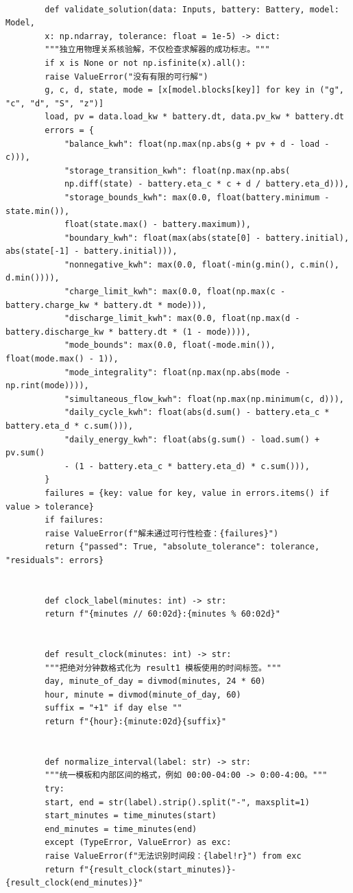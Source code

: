 \documentclass[UTF8]{ctexart}
\begin{document}
\begin{verbatim}
        
        def validate_solution(data: Inputs, battery: Battery, model: Model,
        x: np.ndarray, tolerance: float = 1e-5) -> dict:
        """独立用物理关系核验解，不仅检查求解器的成功标志。"""
        if x is None or not np.isfinite(x).all():
        raise ValueError("没有有限的可行解")
        g, c, d, state, mode = [x[model.blocks[key]] for key in ("g", "c", "d", "S", "z")]
        load, pv = data.load_kw * battery.dt, data.pv_kw * battery.dt
        errors = {
            "balance_kwh": float(np.max(np.abs(g + pv + d - load - c))),
            "storage_transition_kwh": float(np.max(np.abs(
            np.diff(state) - battery.eta_c * c + d / battery.eta_d))),
            "storage_bounds_kwh": max(0.0, float(battery.minimum - state.min()),
            float(state.max() - battery.maximum)),
            "boundary_kwh": float(max(abs(state[0] - battery.initial), abs(state[-1] - battery.initial))),
            "nonnegative_kwh": max(0.0, float(-min(g.min(), c.min(), d.min()))),
            "charge_limit_kwh": max(0.0, float(np.max(c - battery.charge_kw * battery.dt * mode))),
            "discharge_limit_kwh": max(0.0, float(np.max(d - battery.discharge_kw * battery.dt * (1 - mode)))),
            "mode_bounds": max(0.0, float(-mode.min()), float(mode.max() - 1)),
            "mode_integrality": float(np.max(np.abs(mode - np.rint(mode)))),
            "simultaneous_flow_kwh": float(np.max(np.minimum(c, d))),
            "daily_cycle_kwh": float(abs(d.sum() - battery.eta_c * battery.eta_d * c.sum())),
            "daily_energy_kwh": float(abs(g.sum() - load.sum() + pv.sum()
            - (1 - battery.eta_c * battery.eta_d) * c.sum())),
        }
        failures = {key: value for key, value in errors.items() if value > tolerance}
        if failures:
        raise ValueError(f"解未通过可行性检查：{failures}")
        return {"passed": True, "absolute_tolerance": tolerance, "residuals": errors}
        
        
        def clock_label(minutes: int) -> str:
        return f"{minutes // 60:02d}:{minutes % 60:02d}"
        
        
        def result_clock(minutes: int) -> str:
        """把绝对分钟数格式化为 result1 模板使用的时间标签。"""
        day, minute_of_day = divmod(minutes, 24 * 60)
        hour, minute = divmod(minute_of_day, 60)
        suffix = "+1" if day else ""
        return f"{hour}:{minute:02d}{suffix}"
        
        
        def normalize_interval(label: str) -> str:
        """统一模板和内部区间的格式，例如 00:00-04:00 -> 0:00-4:00。"""
        try:
        start, end = str(label).strip().split("-", maxsplit=1)
        start_minutes = time_minutes(start)
        end_minutes = time_minutes(end)
        except (TypeError, ValueError) as exc:
        raise ValueError(f"无法识别时间段：{label!r}") from exc
        return f"{result_clock(start_minutes)}-{result_clock(end_minutes)}"
        

\end{verbatim}
\end{document}
